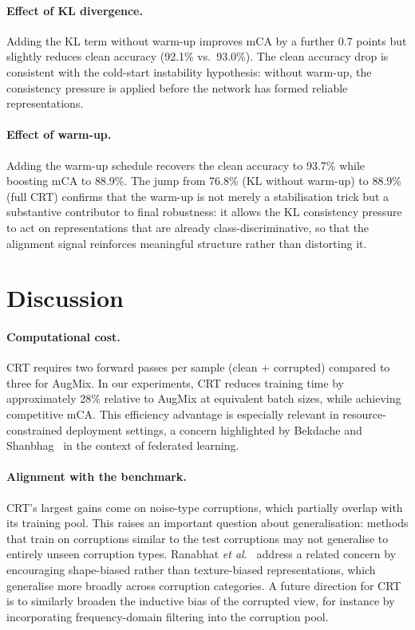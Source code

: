 \documentclass[10pt,twocolumn]{article}
\begin{document}
\paragraph{Effect of KL divergence.} Adding the KL term without warm-up improves mCA by a further 0.7 points but slightly reduces clean accuracy (92.1\% vs.\ 93.0\%). The clean accuracy drop is consistent with the cold-start instability hypothesis: without warm-up, the consistency pressure is applied before the network has formed reliable representations.

\paragraph{Effect of warm-up.} Adding the warm-up schedule recovers the clean accuracy to 93.7\% while boosting mCA to 88.9\%. The jump from 76.8\% (KL without warm-up) to 88.9\% (full CRT) confirms that the warm-up is not merely a stabilisation trick but a substantive contributor to final robustness: it allows the KL consistency pressure to act on representations that are already class-discriminative, so that the alignment signal reinforces meaningful structure rather than distorting it.

\section{Discussion}

\paragraph{Computational cost.} CRT requires two forward passes per sample (clean + corrupted) compared to three for AugMix. In our experiments, CRT reduces training time by approximately 28\% relative to AugMix at equivalent batch sizes, while achieving competitive mCA. This efficiency advantage is especially relevant in resource-constrained deployment settings, a concern highlighted by Bekdache and Shanbhag~\cite{bekdache2025federl} in the context of federated learning.

\paragraph{Alignment with the benchmark.} CRT's largest gains come on noise-type corruptions, which partially overlap with its training pool. This raises an important question about generalisation: methods that train on corruptions similar to the test corruptions may not generalise to entirely unseen corruption types. Ranabhat \emph{et al.}~\cite{ranabhat2025shapebias} address a related concern by encouraging shape-biased rather than texture-biased representations, which generalise more broadly across corruption categories. A future direction for CRT is to similarly broaden the inductive bias of the corrupted view, for instance by incorporating frequency-domain filtering into the corruption pool.
\end{document}
